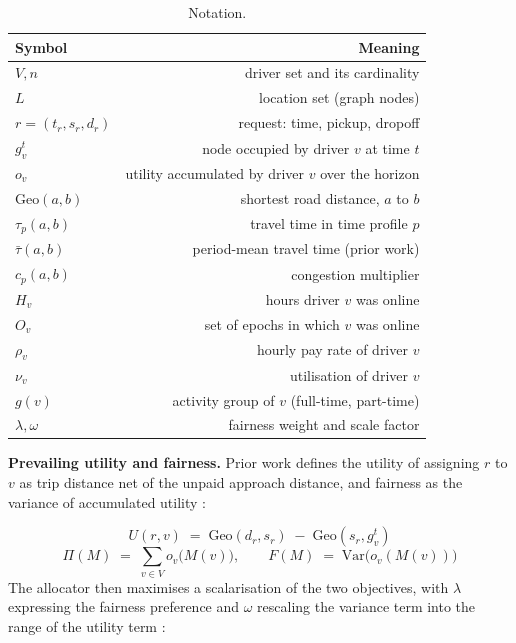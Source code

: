 \documentclass[10pt,twocolumn]{article}
\begin{document}
\begin{table}[t]
\centering
\caption{Notation.}
\label{tab:notation}
\small
\begin{tabular}{lr}
\toprule
Symbol & Meaning \\
\midrule
\(V, n\) & driver set and its cardinality \\
\(L\) & location set (graph nodes) \\
\(r=(t_r,s_r,d_r)\) & request: time, pickup, dropoff \\
\(g_v^t\) & node occupied by driver \(v\) at time \(t\) \\
\(o_v\) & utility accumulated by driver \(v\) over the horizon \\
\(\mathrm{Geo}(a,b)\) & shortest road distance, \(a\) to \(b\) \\
\(\tau_p(a,b)\) & travel time in time profile \(p\) \\
\(\bar{\tau}(a,b)\) & period-mean travel time (prior work) \\
\(c_p(a,b)\) & congestion multiplier \\
\(H_v\) & hours driver \(v\) was online \\
\(O_v\) & set of epochs in which \(v\) was online \\
\(\rho_v\) & hourly pay rate of driver \(v\) \\
\(\nu_v\) & utilisation of driver \(v\) \\
\(g(v)\) & activity group of \(v\) (full-time, part-time) \\
\(\lambda, \omega\) & fairness weight and scale factor \\
\bottomrule
\end{tabular}
\end{table}
\textbf{Prevailing utility and fairness.} Prior work defines the utility of assigning \(r\) to \(v\) as trip distance net of the unpaid approach distance, and fairness as the variance of accumulated utility \cite{raman2021,kang2024}:

\begin{equation}\label{eq:util-prior}
U(r,v) \;=\; \mathrm{Geo}(d_r,s_r) \;-\; \mathrm{Geo}(s_r,g_v^t)
\end{equation}
\begin{equation}\label{eq:eff-fair}
\Pi(M) \;=\; \sum_{v \in V} o_v\big(M(v)\big), \qquad F(M) \;=\; \mathrm{Var}\big(o_v(M(v))\big)
\end{equation}
The allocator then maximises a scalarisation of the two objectives, with \(\lambda\) expressing the fairness preference and \(\omega\) rescaling the variance term into the range of the utility term \cite{miettinen2002}:
\end{document}
